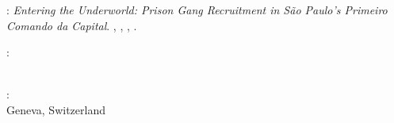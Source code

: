 
\thispagestyle{empty}

\hfill

\vfill

\noindent\myName: \textit{Entering the Underworld: Prison Gang Recruitment in S\~{a}o Paulo's Primeiro Comando da Capital}. \myDegree, \myUni, \myLocation, \myTime.


\bigskip

\noindent{}: \\
\myProf \\

\medskip

\noindent{}: \\
Geneva, Switzerland

\medskip

